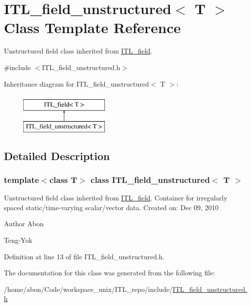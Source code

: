 \hypertarget{classITL__field__unstructured}{
\section{ITL\_\-field\_\-unstructured$<$ T $>$ Class Template Reference}
\label{classITL__field__unstructured}
}


Unstructured field class inherited from \hyperlink{classITL__field}{ITL\_\-field}.  




{\ttfamily \#include $<$ITL\_\-field\_\-unstructured.h$>$}

Inheritance diagram for ITL\_\-field\_\-unstructured$<$ T $>$:\begin{figure}[H]
\begin{center}
\leavevmode
\includegraphics[height=2cm]{classITL__field__unstructured}
\end{center}
\end{figure}


\subsection{Detailed Description}
\subsubsection*{template$<$class T$>$ class ITL\_\-field\_\-unstructured$<$ T $>$}

Unstructured field class inherited from \hyperlink{classITL__field}{ITL\_\-field}. Container for irregularly spaced static/time-\/varying scalar/vector data. Created on: Dec 09, 2010 \begin{DoxyAuthor}{Author}
Abon 

Teng-\/Yok 
\end{DoxyAuthor}


Definition at line 13 of file ITL\_\-field\_\-unstructured.h.



The documentation for this class was generated from the following file:\begin{DoxyCompactItemize}
\item 
/home/abon/Code/workspace\_\-unix/ITL\_\-repo/include/\hyperlink{ITL__field__unstructured_8h}{ITL\_\-field\_\-unstructured.h}\end{DoxyCompactItemize}

